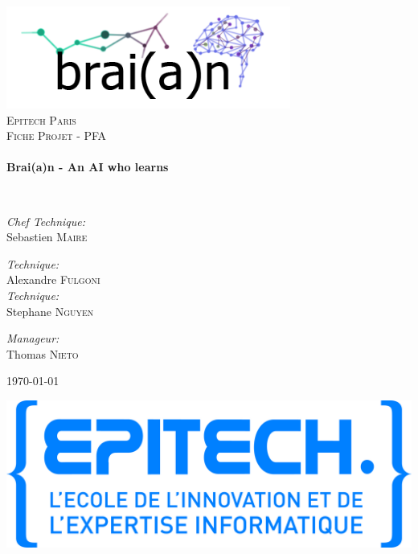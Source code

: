 \begin{titlepage}
  \begin{center}

    \includegraphics[width=0.7\textwidth]{braian}~\\[1cm]

    \textsc{\LARGE Epitech Paris}\\[1.5cm]

    \textsc{\Large Fiche Projet - PFA}\\[0.5cm]

    \HRule \\[0.4cm]
    { \huge \bfseries Brai(a)n - An AI who learns \\[0.4cm] }

    \HRule \\[1.5cm]

    \noindent

    \begin{multicols}{2}
      \emph{Chef Technique:}\\
      Sebastien \textsc{Maire} \\

      \vspace{1cm}

      \emph{Technique:} \\
      Alexandre \textsc{Fulgoni} \\

      \emph{Technique:} \\
      Stephane \textsc{Nguyen} \\

      \vspace{1cm}

      \emph{Manageur:} \\
      Thomas \textsc{Nieto} \\
    \end{multicols}

    \vfill

    {\large \today}

  \end{center}

  \begin{flushright}
    \vspace{1cm}
    \includegraphics[scale=0.03]{Logo-Epitech}
  \end{flushright}

\end{titlepage}

